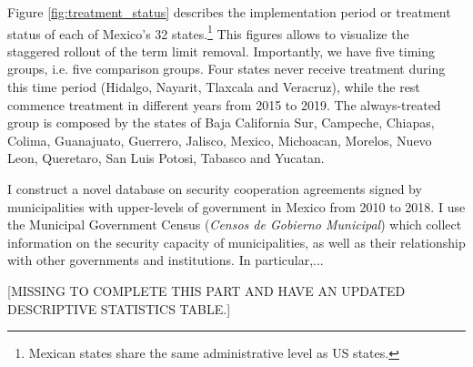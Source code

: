 \documentclass[12pt]{amsart}
\makeatletter
\def\section{\@startsection{section}{1}
	\z@{1.0\linespacing\@plus\linespacing}{.5\linespacing}{\Large}}
\numberwithin{equation}{section}
\theoremstyle{definition}
\theoremstyle{definition}
\theoremstyle{definition}
\makeatother
\begin{document}
Figure \ref{fig:treatment_status} describes the implementation period or treatment status of each of Mexico's 32 states.\footnote{Mexican states share the same administrative level as US states.} This figures allows to visualize the staggered rollout of the term limit removal. Importantly, we have five timing groups, i.e. five comparison groups. Four states never receive treatment during this time period (Hidalgo, Nayarit, Tlaxcala and Veracruz), while the rest commence treatment in different years from 2015 to 2019. The always-treated group is composed by the states of Baja California Sur, Campeche, Chiapas, Colima, Guanajuato, Guerrero, Jalisco, Mexico, Michoacan, Morelos, Nuevo Leon, Queretaro, San Luis Potosi, Tabasco and Yucatan. 
 

\section{Data \label{sec:data}}  

I construct a novel database on security cooperation agreements signed by municipalities with upper-levels of government in Mexico from 2010 to 2018. I use the Municipal Government Census (\emph{Censos de Gobierno Municipal}) which collect information on the security capacity of municipalities, as well as their relationship with other governments and institutions. In particular,... 


 [MISSING TO COMPLETE THIS PART AND HAVE AN UPDATED DESCRIPTIVE STATISTICS TABLE.] 
\end{document}
